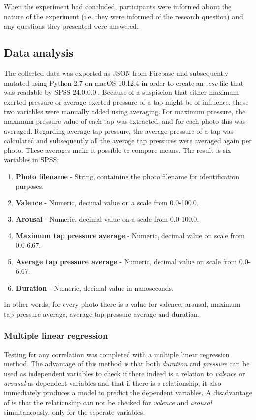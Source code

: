 \documentclass{sigchi}
\begin{document}
When the experiment had concluded, participants were informed about the nature of the experiment (i.e. they were informed of the research question) and any questions they presented were answered.

\subsection{Data analysis}
\label{sub:data_analysis}
The collected data was exported as JSON from Firebase and subsequently mutated using Python 2.7 \cite{python} on macOS 10.12.4 \cite{macOSSierra} in order to create an \textit{.csv} file that was readable by SPSS 24.0.0.0 \cite{SPSS}. Because of a suspiscion that either maximum exerted pressure or average exerted pressure of a tap might be of influence, these two variables were manually added using averaging. For maximum pressure, the maximum pressure value of each tap was extracted, and for each photo this was averaged. Regarding average tap pressure, the average pressure of a tap was calculated and subsequently all the average tap pressures were averaged again per photo. These averages make it possible to compare means. The result is six variables in SPSS; 
\begin{enumerate}
  \item \textbf{Photo filename} - String, containing the photo filename for identification purposes.
  \item \textbf{Valence} - Numeric, decimal value on a scale from 0.0-100.0.
  \item \textbf{Arousal} - Numeric, decimal value on a scale from 0.0-100.0.
  \item \textbf{Maximum tap pressure average} - Numeric, decimal value on scale from 0.0-6.67.
  \item \textbf{Average tap pressure average} - Numeric, decimal value on scale from 0.0-6.67.
  \item \textbf{Duration} - Numeric, decimal value in nanoseconds.
\end{enumerate}

In other words, for every photo there is a value for valence, arousal, maximum tap pressure average, average tap pressure average and duration.

\subsubsection{Multiple linear regression}
\label{subsub:multiple_linear_regression}
Testing for any correlation was completed with a multiple linear regression method. The advantage of this method is that both \textit{duration} and \textit{pressure} can be used as independent variables to check if there indeed is a relation to \textit{valence} or \textit{arousal} as dependent variables and that if there is a relationship, it also immediately produces a model to predict the dependent variables. A disadvantage of is that the relationship can not be checked for \textit{valence} and \textit{arousal} simultaneously, only for the seperate variables.
\end{document}
